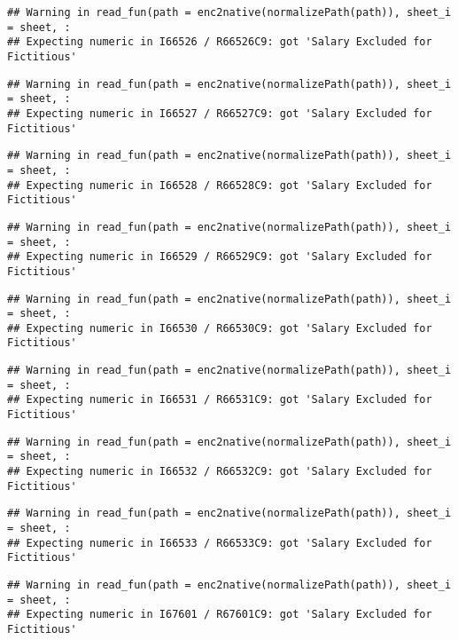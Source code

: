 \documentclass[
]{article}
\begin{document}
\begin{verbatim}
## Warning in read_fun(path = enc2native(normalizePath(path)), sheet_i = sheet, :
## Expecting numeric in I66526 / R66526C9: got 'Salary Excluded for Fictitious'
\end{verbatim}

\begin{verbatim}
## Warning in read_fun(path = enc2native(normalizePath(path)), sheet_i = sheet, :
## Expecting numeric in I66527 / R66527C9: got 'Salary Excluded for Fictitious'
\end{verbatim}

\begin{verbatim}
## Warning in read_fun(path = enc2native(normalizePath(path)), sheet_i = sheet, :
## Expecting numeric in I66528 / R66528C9: got 'Salary Excluded for Fictitious'
\end{verbatim}

\begin{verbatim}
## Warning in read_fun(path = enc2native(normalizePath(path)), sheet_i = sheet, :
## Expecting numeric in I66529 / R66529C9: got 'Salary Excluded for Fictitious'
\end{verbatim}

\begin{verbatim}
## Warning in read_fun(path = enc2native(normalizePath(path)), sheet_i = sheet, :
## Expecting numeric in I66530 / R66530C9: got 'Salary Excluded for Fictitious'
\end{verbatim}

\begin{verbatim}
## Warning in read_fun(path = enc2native(normalizePath(path)), sheet_i = sheet, :
## Expecting numeric in I66531 / R66531C9: got 'Salary Excluded for Fictitious'
\end{verbatim}

\begin{verbatim}
## Warning in read_fun(path = enc2native(normalizePath(path)), sheet_i = sheet, :
## Expecting numeric in I66532 / R66532C9: got 'Salary Excluded for Fictitious'
\end{verbatim}

\begin{verbatim}
## Warning in read_fun(path = enc2native(normalizePath(path)), sheet_i = sheet, :
## Expecting numeric in I66533 / R66533C9: got 'Salary Excluded for Fictitious'
\end{verbatim}

\begin{verbatim}
## Warning in read_fun(path = enc2native(normalizePath(path)), sheet_i = sheet, :
## Expecting numeric in I67601 / R67601C9: got 'Salary Excluded for Fictitious'
\end{verbatim}
\end{document}
